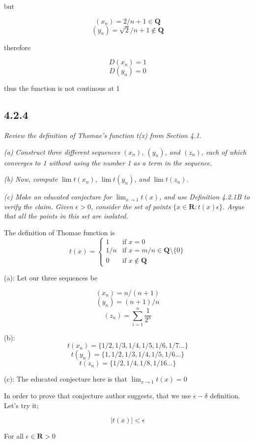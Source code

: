 \documentclass[11pt,oneside,titlepage]{book}
\begin{document}
but

$$(x_n) = 2/n + 1 \in \textbf{Q}$$
$$(y_n) = \sqrt{2}/n + 1 \notin \textbf{Q}$$

therefore

$$ D(x_n) = 1$$
$$ D(y_n) = 0$$

thus the function is not continous at 1

\subsection*{4.2.4}
\textit{Review the definition of Thomae’s function t(x) from Section 4.1.}

\textit{(a) Construct three different sequences $(x_n)$, $(y_n)$, and $(z_n)$,
  each of which converges to 1 without using the number 1 as a term in the sequence.}

\textit{(b) Now, compute $\lim t(x_n)$, $\lim t(y_n)$, and $\lim t(z_n)$.}

\textit{(c) Make an educated conjecture for $\lim_{x\to1} t(x)$, and use Definition 4.2.1B
  to verify the claim. Given $\epsilon > 0$, consider the set of points
$\{x \in \textbf{R} : t(x)  \epsilon\}$.  Argue that all the points in this set are isolated.}


The definition of  Thomae function is
\begin{equation}
t(x)=
    \begin{cases}
      1 & \text{if } x = 0\\
      1/n & \text {if } x = m/n \in \textbf{Q} \text{\textbackslash} \{0\} \\
      0 & \text{if } x \notin \textbf{Q}
    \end{cases}
\end{equation}

(a): Let our three sequences be

$$ (x_n) = n/(n + 1)$$
$$ (y_n) = (n + 1)/n$$
$$ (z_n) = \sum_{i=1}^{n}{\frac{1}{2^n}}$$

(b):
$$t(x_n) = \{1/2, 1/3, 1/4, 1/5, 1/6, 1/7 ...\}$$
$$t(y_n) = \{1, 1/2, 1/3, 1/4, 1/5, 1/6 ...\}$$
$$t(z_n) = \{1/2, 1/4, 1/8, 1/16 ...\}$$

(c): The educated conjecture here is that $\lim_{x \to 1} t(x) = 0$

In order to prove that conjecture author suggests, that we use $\epsilon-\delta$ definition. Let's try
it;

$$ |t(x)| < \epsilon$$

For all $\epsilon \in \textbf{R} > 0$
\end{document}
